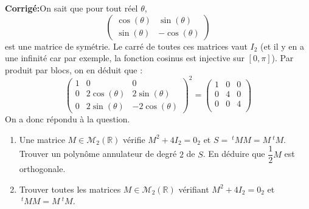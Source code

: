 \documentclass[a4paper,twoside,french,11pt]{VcCours}
\newcommand{\corr}{\textbf{Corrigé:}}
\begin{document}
\corr On sait que pour tout réel $\theta$,
$$ \begin{pmatrix}
\cos(\theta) & \sin(\theta) \\
\sin(\theta) & -\cos(\theta) 
\end{pmatrix}$$
est une matrice de symétrie. Le carré de toutes ces matrices vaut $I_2$ (et il y en a une infinité car par exemple, la fonction cosinus est injective sur $[0, \pi]$). Par produit par blocs, on en déduit que :
$$ \begin{pmatrix}
1 & 0 & 0 \\
0& 2\cos(\theta) & 2\sin(\theta) \\
0& 2\sin(\theta) & -2\cos(\theta) 
\end{pmatrix}^2= \begin{pmatrix}
1 & 0 & 0 \\
0 & 4 & 0 \\
0 & 0 & 4 \\
\end{pmatrix}$$
On a donc répondu à la question.

\begin{Exercice}{}
\begin{enumerate}
\item Une matrice $M \in \mathcal{M}_2(\mathbb{R})$ vérifie $M^2+4I_2=0_2$ et $S=~^tM M = M ~^tM$. Trouver un polynôme annulateur de degré $2$ de $S$. En déduire que $\dfrac{1}{2}M$ est orthogonale.
\item Trouver toutes les matrices $M \in \mathcal{M}_2(\mathbb{R})$ vérifiant $M^2+4I_2=0_2$ et $~^tM M = M ~^tM$.
\end{enumerate}
\end{Exercice}
\end{document}
